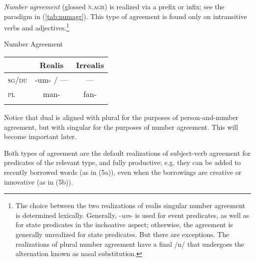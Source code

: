 \documentclass[output=paper,
modfonts
]{LSP/langsci}
\begin{document}
\begin{exe}
\begin{xlist}
\emph{Number agreement} (glossed \textsc{n.agr)} is realized via a
prefix or infix; see the paradigm in (\ref{tab:numagr}). This type of agreement is
found only on intransitive verbs and adjectives.\footnote{The choice
  between the two realizations of realis singular number agreement is
  determined lexically. Generally, -\emph{um}- is used for event
  predicates, as well as for state predicates in the inchoative aspect;
  otherwise, the agreement is generally unrealized for state predicates.
  But there are exceptions. The realizations of plural number agreement
  have a final /n/ that undergoes the alternation known as nasal
  substitution.}

\ea Number Agreement\\
	\begin{tabular}{lcc}
		\lsptoprule
		& Realis & Irrealis \\
		\midrule
		\textsc{sg/du} & -um- / --- & --- \\
		\textsc{pl} & man- & fan- \\
		\lspbottomrule
	\end{tabular}
	\label{tab:numagr}
\z

%			

Notice that dual is aligned with plural for the purposes of
person-and-number agreement, but with singular for the purposes of
number agreement. This will become important later.

Both types of agreement are the default realizations of subject-verb
agreement for predicates of the relevant type, and fully productive;
e.g. they can be added to recently borrowed words (as in (5a)), even
when the borrowings are creative or innovative (as in (5b)).


\end{xlist}
\end{exe}
\end{document}
